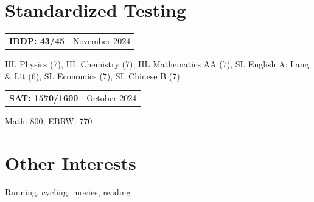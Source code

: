 \documentclass[11pt,a4paper]{article}
\makeatletter
\newcommand{\indentedsection}[2]{
  \section*{#1}
  \vspace{-4pt}
  \hspace{1.5em}
  \begin{minipage}{\dimexpr\textwidth-1.5em}
    #2
  \end{minipage}
}
\newcommand{\entry}[3]{
  \begin{minipage}{\textwidth}
    \noindent
    \begin{tabularx}{\textwidth}{@{}>{\bfseries}X@{\hspace{5em}}>{\raggedleft\arraybackslash}p{3cm}@{}}
      #1 & #2 \\
    \end{tabularx}
    \par\vspace{0.1em} %
    \begin{minipage}[t]{\dimexpr\textwidth - 9em\relax}
      \setlength{\parskip}{0.4em} %
      #3
    \end{minipage}
    \vspace{10pt}
  \end{minipage}
  
}
\makeatother
\begin{document}
\indentedsection{Standardized Testing}{
  \entry{IBDP: 43/45}{November 2024}
  {HL Physics (7), HL Chemistry (7), HL Mathematics AA (7), SL English A: Lang \& Lit (6), SL Economics (7), SL Chinese B (7)}

  \entry{SAT: 1570/1600}{October 2024}
  {Math: 800, EBRW: 770}
}

\indentedsection{Other Interests}{
  Running, cycling, movies, reading
}
\end{document}

